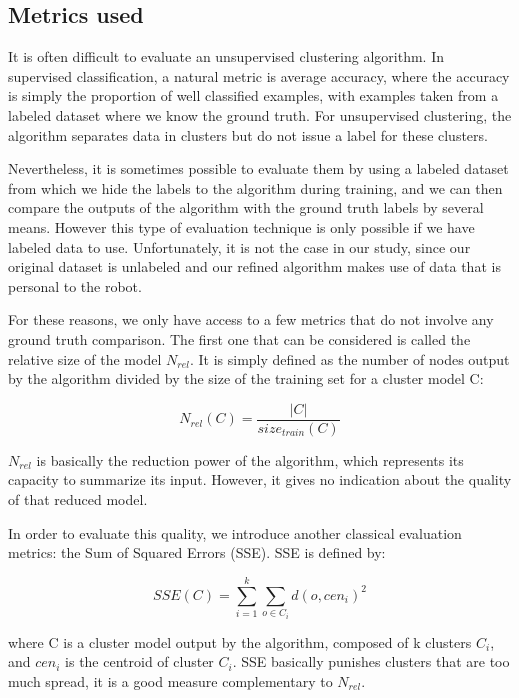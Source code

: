 \subsection{Metrics used}
It is often difficult to evaluate an unsupervised clustering algorithm. In supervised classification, a natural metric is average accuracy, where the accuracy is simply the proportion of well classified examples, with examples taken from a labeled dataset where we know the ground truth. For unsupervised clustering, the algorithm separates data in clusters but do not issue a label for these clusters. 

Nevertheless, it is sometimes possible to evaluate them by using a labeled dataset from which we hide the labels to the algorithm during training, and we can then compare the outputs of the algorithm with the ground truth labels by several means. However this type of evaluation technique is only possible if we have labeled data to use. Unfortunately, it is not the case in our study, since our original dataset is unlabeled and our refined algorithm makes use of data that is personal to the robot. 

For these reasons, we only have access to a few metrics that do not involve any ground truth comparison. The first one that can be considered is called the relative size of the model $N_{rel}$. It is simply defined as the number of nodes output by the algorithm divided by the size of the training set for a cluster model C: 

\begin{equation}
    N_{rel}(C) = \frac{|C|}{size_{train}(C)}
\end{equation}

$N_{rel}$ is basically the reduction power of the algorithm, which represents its capacity to summarize its input. However, it gives no indication about the quality of that reduced model.

In order to evaluate this quality, we introduce another classical evaluation metrics: the Sum of Squared Errors (SSE)\cite{sse-silhouette}. SSE is defined by:

\begin{equation}
    SSE(C) = \sum_{i=1}^k\sum_{o \in C_i}d(o, cen_{i})^2
\end{equation}

where C is a cluster model output by the algorithm, composed of k clusters $C_i$, and $cen_i$ is the centroid of cluster $C_i$. SSE basically punishes clusters that are too much spread, it is a good measure complementary to $N_{rel}$.

